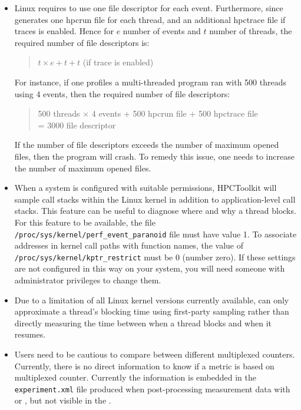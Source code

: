 \begin{itemize}
\item
Linux \perfevents{} requires to use one file descriptor for each event. 
Furthermore, since \hpcrun{} generates one hpcrun file for each thread, and an additional hpctrace file if traces is enabled.
Hence for $e$ number of events and $t$ number of threads, the required number of file descriptors is: 
\begin{quote}
  $t \times e + t + t$ (if trace is enabled) 
\end{quote}
For instance, if one profiles a multi-threaded program ran with 500 threads using 4 events, then the required number of file descriptors: 
\begin{quote}
  500 threads $\times$ 4 events + 500 hpcrun file + 500 hpctrace file \\
  = 3000 file descriptor
\end{quote}
If the number of file descriptors exceeds the number of maximum opened files, then the program will crash. 
To remedy this issue, one needs to increase the number of maximum opened files.

\item
\sloppy
When a system is configured with suitable permissions, HPCToolkit will sample call stacks
within the Linux kernel in addition to application-level call stacks. This feature can be useful to diagnose where and why a thread blocks.
For this feature to be available, the file
\verb|/proc/sys/kernel/perf_event_paranoid| file must have value 1.  To associate addresses
in kernel call paths with function names, the value of
\verb|/proc/sys/kernel/kptr_restrict| must be 0 (number zero). If these settings are not configured in this way on your system, you will need someone with administrator privileges to change them.

\item
Due to a limitation of all Linux kernel versions currently available,  
\hpcrun{} can only approximate a thread's blocking time using first-party sampling rather than directly measuring the time between when a thread blocks and when it resumes.  


\item
Users need to be cautious to compare between different multiplexed
counters. Currently, there is no direct information to 
know if a metric is based on multiplexed counter. Currently the information
is embedded in the \verb|experiment.xml| file produced when post-processing measurement data with \hpcprof{} or \hpcprofmpi, but not visible in the \hpcviewer.
\end{itemize}

